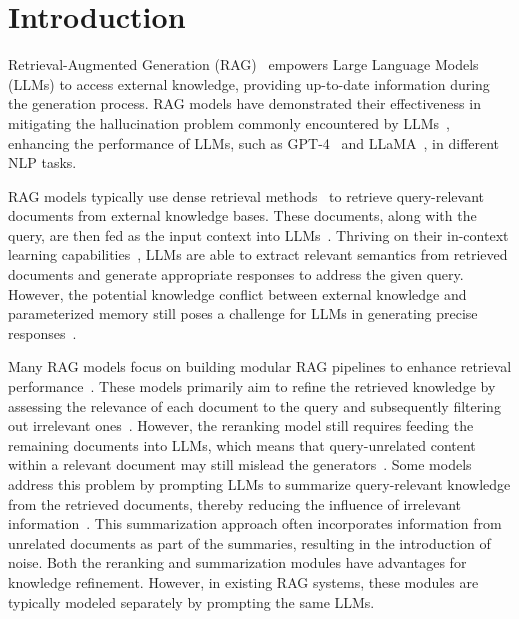 \section{Introduction}
Retrieval-Augmented Generation (RAG)~\cite{NEURIPS2020_6b493230, guu2020retrieval, ram-etal-2023-context, shi-etal-2024-replug} empowers Large Language Models (LLMs) to access external knowledge, providing up-to-date information during the generation process. RAG models have demonstrated their effectiveness in mitigating the hallucination problem commonly encountered by LLMs~\cite{shuster2021retrieval}, enhancing the performance of LLMs, such as GPT-4~\cite{achiam2023gpt} and LLaMA~\cite{touvron2023llama}, in different NLP tasks.


RAG models typically use dense retrieval methods~\cite{karpukhin2020dense, DBLP:conf/iclr/XiongXLTLBAO21} to retrieve query-relevant documents from external knowledge bases. These documents, along with the query, are then fed as the input context into LLMs~\cite{ram-etal-2023-context}. Thriving on their in-context learning capabilities~\cite{brown2020language,dong2022survey}, LLMs are able to extract relevant semantics from retrieved documents and generate appropriate responses to address the given query. However, the potential knowledge conflict between external knowledge and parameterized memory still poses a challenge for LLMs in generating precise responses~\cite{chen2024benchmarking, asai2024reliable}.


Many RAG models focus on building modular RAG pipelines to enhance retrieval performance~\cite{gao2024modular,asai2024selfrag}. These models primarily aim to refine the retrieved knowledge by assessing the relevance of each document to the query and subsequently filtering out irrelevant ones~\cite{yan2024corrective, asai2024selfrag}. However, the reranking model still requires feeding the remaining documents into LLMs, which means that query-unrelated content within a relevant document may still mislead the generators~\cite{xu2024recomp}. Some models address this problem by prompting LLMs to summarize query-relevant knowledge from the retrieved documents, thereby reducing the influence of irrelevant information~\cite{vig2021exploring, yu-etal-2024-chain, xu2024recomp}. This summarization approach often incorporates information from unrelated documents as part of the summaries, resulting in the introduction of noise. Both the reranking and summarization modules have advantages for knowledge refinement. However, in existing RAG systems, these modules are typically modeled separately by prompting the same LLMs.

